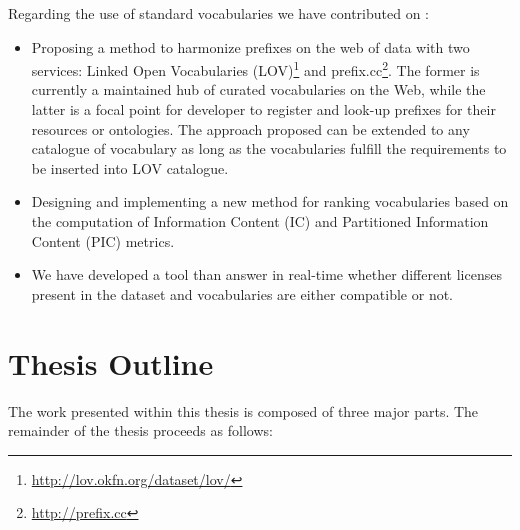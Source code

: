 Regarding the use of standard vocabularies we have contributed on : 
\begin{itemize}

\item  Proposing a method to harmonize prefixes on the web of data  with two services: Linked Open Vocabularies (LOV)\footnote{\url{http://lov.okfn.org/dataset/lov/}} and prefix.cc\footnote{\url{http://prefix.cc}}. The former is currently a maintained hub of curated vocabularies on the Web, while the latter is a focal point for developer to register and look-up prefixes for their resources or ontologies. The approach proposed can be extended to any catalogue of vocabulary as long as the vocabularies fulfill the requirements to be inserted into LOV catalogue. 

\item  Designing and implementing a new method for ranking vocabularies based on the computation of Information Content (IC) and Partitioned Information Content (PIC) metrics.

\item We have developed a tool than answer in real-time whether different licenses present in the dataset and vocabularies are either compatible or not. 
\end{itemize}

\section{Thesis Outline}
\label{sec:thesis-structure}

The work presented within this thesis is composed of three major parts. The remainder of the thesis proceeds as follows:


